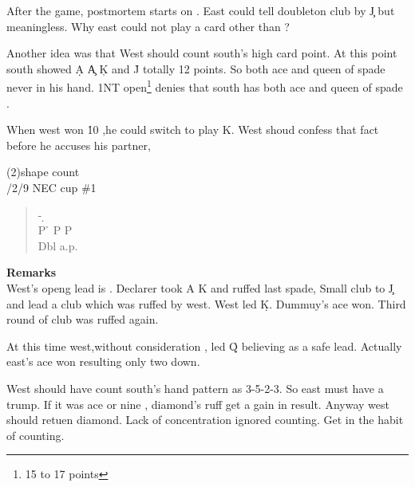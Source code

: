 After the game, postmortem starts on .
East could tell doubleton club by \c J but meaningless. Why east could not
play a card other than ?

Another idea was that West should count south's high card point. At this point
south showed \d A \c A \c K and \h J totally  12 points. So both ace and queen 
of spade never in his hand.
1NT open\footnote{15 to 17 points} denies that  south has both ace and queen of spade .


When west won \h 10 ,he could switch to play \s K.
West shoud confess that fact before he accuses his partner,

\vspace{0.5cm}


(2){shape count}\\

/2/9 NEC cup \#1
\begin{quote}
%
 {}%
  {}%
  {}%
  {}%
   \end{quote}
\begin{quote}
\begin{bidding}
- \d  {}\s {}\h\\
P \h \> P \> P \\
Dbl \>  a.p.\\
\end{bidding}
\end{quote}
{\bf Remarks}\\

West's openg lead is .
Declarer took \s A \s K and ruffed last spade,
Small club to \c J and lead a club which was ruffed by west.
West led \d K. Dummuy's ace won. Third round of club was ruffed again.

At this time west,without consideration , led \h Q believing as a safe lead.
Actually east's ace won resulting only two down.

West should have count south's hand pattern as 3-5-2-3. So east 
must have a trump. If it was ace or nine , diamond's ruff get a 
gain in result. Anyway west should retuen diamond.
Lack of concentration ignored counting. Get in the habit of
counting.

